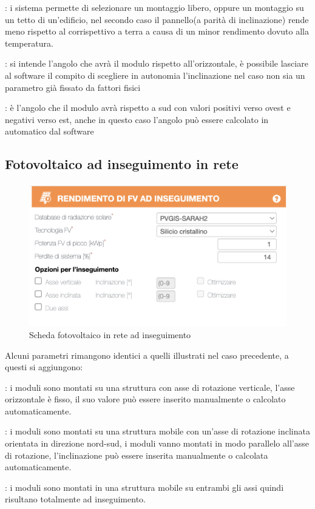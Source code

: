 \begin{description}[labelindent=5mm]
    \item[$\bullet$ Posizione di montaggio]: i sistema permette di selezionare un montaggio libero, oppure un montaggio su un tetto di un'edificio, nel secondo caso il pannello(a parità di inclinazione) rende meno rispetto al corrispettivo a terra a causa di un minor rendimento dovuto alla temperatura.
    \item[$\bullet$ Inclinazione]: si intende l'angolo che avrà il modulo rispetto all'orizzontale, è possibile lasciare al software il compito di scegliere in autonomia l'inclinazione nel caso non sia un parametro già fissato da fattori fisici
    \item[$\bullet$ Orientamento]: è l'angolo che il modulo avrà rispetto a sud con valori positivi verso ovest e negativi verso est, anche in questo caso l'angolo può essere calcolato in automatico dal software
\end{description}
\vfill
\subsection{Fotovoltaico ad inseguimento in rete}
\begin{figure}[H]
    \centering
    \includegraphics[height=0.5\textwidth]{res/cap 4/moduli ad inseguimento}
    \caption{Scheda fotovoltaico in rete ad inseguimento}
\end{figure}\noindent
Alcuni parametri rimangono identici a quelli illustrati nel caso precedente, a questi si aggiungono:
\begin{description}[labelindent=5mm]
    \item[$\bullet$ Asse verticale]: i moduli sono montati su una struttura con asse di rotazione verticale, l'asse orizzontale è fisso, il suo valore può essere inserito manualmente o calcolato automaticamente.
    \item[$\bullet$ Asse inclinata]: i moduli sono montati su una struttura mobile con un'asse di rotazione inclinata orientata in direzione nord-sud, i moduli vanno montati in modo parallelo all'asse di rotazione, l'inclinazione può essere inserita manualmente o calcolata automaticamente.
    \item[$\bullet$ Due assi]: i moduli sono montati in una struttura mobile su entrambi gli assi quindi risultano totalmente ad inseguimento.
\end{description}
\vfill
